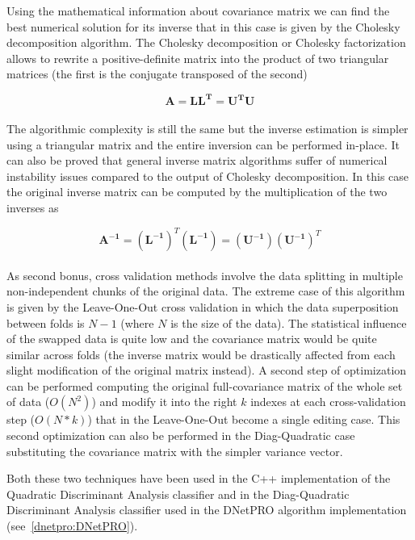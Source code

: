\documentclass{standalone}
\begin{document}
Using the mathematical information about covariance matrix we can find the best numerical solution for its inverse that in this case is given by the Cholesky decomposition algorithm.
The Cholesky decomposition or Cholesky factorization allows to rewrite a positive-definite matrix into the product of two triangular matrices (the first is the conjugate transposed of the second)

$$
\mathbf{A} = \mathbf{LL^T} = \mathbf{U^TU}
$$
\\
The algorithmic complexity is still the same but the inverse estimation is simpler using a triangular matrix and the entire inversion can be performed in-place.
It can also be proved that general inverse matrix algorithms suffer of numerical instability issues compared to the output of Cholesky decomposition.
In this case the original inverse matrix can be computed by the multiplication of the two inverses as

$$
\mathbf{A^{-1}} = (\mathbf{L^{-1}})^T(\mathbf{L^{-1}}) = (\mathbf{U^{-1}})(\mathbf{U^{-1}})^T
$$
\\
As second bonus, cross validation methods involve the data splitting in multiple non-independent chunks of the original data.
The extreme case of this algorithm is given by the Leave-One-Out cross validation in which the data superposition between folds is $N-1$ (where $N$ is the size of the data).
The statistical influence of the swapped data is quite low and the covariance matrix would be quite similar across folds (the inverse matrix would be drastically affected from each slight modification of the original matrix instead).
A second step of optimization can be performed computing the original full-covariance matrix of the whole set of data ($O(N^2)$) and modify it into the right $k$ indexes at each cross-validation step ($O(N*k)$) that in the Leave-One-Out become a single editing case.
This second optimization  can also be performed in the Diag-Quadratic case substituting the covariance matrix with the simpler variance vector.


Both these two techniques have been used in the \textsf{C++} implementation of the Quadratic Discriminant Analysis classifier and in the Diag-Quadratic Discriminant Analysis classifier used in the DNetPRO algorithm implementation (see~\ref{dnetpro:DNetPRO}).
\end{document}
